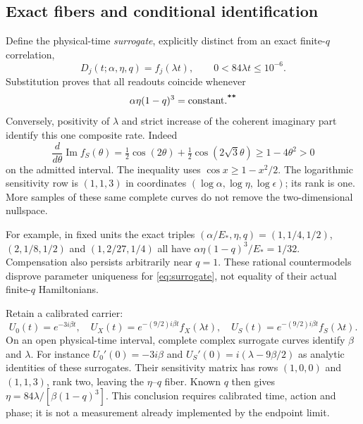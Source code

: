 \documentclass[11pt,a4paper]{article}
\newcommand{\workstar}{\textsuperscript{\textbf{**}}}
\DeclareMathOperator{\Impart}{Im}
\begin{document}
\subsection{Exact fibers and conditional identification}
Define the physical-time \emph{surrogate}, explicitly distinct from an exact finite-$q$ correlation,
\begin{equation}
D_j(t;\alpha,\eta,q)=f_j(\lambda t),\qquad 0<84\lambda t\le10^{-6}.
\label{eq:surrogate}
\end{equation}
Substitution proves that all readouts coincide whenever
\begin{equation}
\alpha\eta(1-q)^3=\text{constant}.\workstar
\label{eq:fiber}
\end{equation}
Conversely, positivity of $\lambda$ and strict increase of the coherent imaginary part identify this one composite rate. Indeed
\begin{equation}
\frac{d}{d\theta}\Impart f_S(\theta)
=\tfrac12\cos(2\theta)+\tfrac12\cos(2\sqrt3\theta)
\ge1-4\theta^2>0
\label{eq:monotone}
\end{equation}
on the admitted interval. The inequality uses $\cos x\ge1-x^2/2$. The logarithmic sensitivity row is $(1,1,3)$ in coordinates $(\log\alpha,\log\eta,\log\epsilon)$; its rank is one. More samples of these same complete curves do not remove the two-dimensional nullspace.

For example, in fixed units the exact triples
$(\alpha/E_*,\eta,q)=(1,1/4,1/2)$, $(2,1/8,1/2)$ and $(1,2/27,1/4)$ all have $\alpha\eta(1-q)^3/E_*=1/32$. Compensation also persists arbitrarily near $q=1$. These rational countermodels disprove parameter uniqueness for \eqref{eq:surrogate}, not equality of their actual finite-$q$ Hamiltonians.

Retain a calibrated carrier:
\begin{equation}
U_0(t)=e^{-3i\beta t},\quad
U_X(t)=e^{-(9/2)i\beta t}f_X(\lambda t),\quad
U_S(t)=e^{-(9/2)i\beta t}f_S(\lambda t).
\label{eq:carrier}
\end{equation}
On an open physical-time interval, complete complex surrogate curves identify $\beta$ and $\lambda$. For instance $U_0'(0)=-3i\beta$ and
$U_S'(0)=i(\lambda-9\beta/2)$ as analytic identities of these surrogates. Their sensitivity matrix has rows $(1,0,0)$ and $(1,1,3)$, rank two, leaving the $\eta$--$q$ fiber. Known $q$ then gives
$\eta=84\lambda/[\beta(1-q)^3]$. This conclusion requires calibrated time, action and phase; it is not a measurement already implemented by the endpoint limit.
\end{document}
